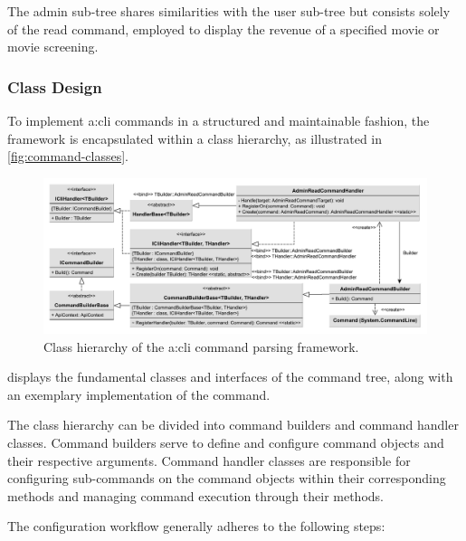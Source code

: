 The admin sub-tree shares similarities with the user sub-tree but consists solely of the read command, employed to display the revenue of a specified movie or movie screening.

\pagebreak

\subsubsection{Class Design}

To implement \gls{a:cli} commands in a structured and maintainable fashion, the  framework is encapsulated within a class hierarchy, as illustrated in \vref{fig:command-classes}.

\begin{figure}[H]
    \centering
    \includegraphics[width=\textwidth]{images/client-cli-command-parsing.pdf}
    \caption{Class hierarchy of the \gls{a:cli} command parsing framework.}
    \label{fig:command-classes}
\end{figure}

 displays the fundamental classes and interfaces of the command tree, along with an exemplary implementation of the  command.

The class hierarchy can be divided into command builders and command handler classes. Command builders serve to define and configure  command objects and their respective arguments. Command handler classes are responsible for configuring sub-commands on the  command objects within their corresponding  methods and managing command execution through their  methods.

The configuration workflow generally adheres to the following steps:

